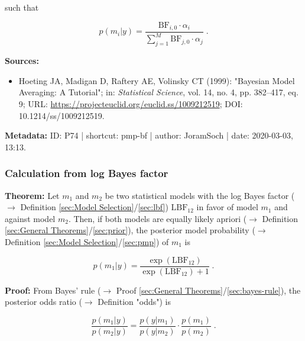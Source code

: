 \documentclass[a4paper,12pt,twoside]{book}
\begin{document}
such that

\begin{equation} \label{eq:pmp-bf-PMP-BF-qed}
p(m_i|y)= \frac{\mathrm{BF}_{i,0} \cdot \alpha_i}{\sum_{j=1}^{M} \mathrm{BF}_{j,0} \cdot \alpha_j} \; .
\end{equation}


\vspace{1em}
\textbf{Sources:}
\begin{itemize}
\item Hoeting JA, Madigan D, Raftery AE, Volinsky CT (1999): "Bayesian Model Averaging: A Tutorial"; in: \textit{Statistical Science}, vol. 14, no. 4, pp. 382–417, eq. 9; URL: \url{https://projecteuclid.org/euclid.ss/1009212519}; DOI: 10.1214/ss/1009212519.
\end{itemize}


\vspace{1em}
\textbf{Metadata:} ID: P74 | shortcut: pmp-bf | author: JoramSoch | date: 2020-03-03, 13:13.
\vspace{1em}



\subsubsection[\textbf{Calculation from log Bayes factor}]{Calculation from log Bayes factor} \label{sec:pmp-lbf}
\setcounter{equation}{0}

\textbf{Theorem:} Let $m_1$ and $m_2$ be two statistical models with the log Bayes factor ($\rightarrow$ Definition \ref{sec:Model Selection}/\ref{sec:lbf}) $\mathrm{LBF}_{12}$ in favor of model $m_1$ and against model $m_2$. Then, if both models are equally likely apriori ($\rightarrow$ Definition \ref{sec:General Theorems}/\ref{sec:prior}), the posterior model probability ($\rightarrow$ Definition \ref{sec:Model Selection}/\ref{sec:pmp}) of $m_1$ is

\begin{equation} \label{eq:pmp-lbf-PMP-LBF}
p(m_1|y) = \frac{\exp(\mathrm{LBF}_{12})}{\exp(\mathrm{LBF}_{12}) + 1} \; .
\end{equation}


\vspace{1em}
\textbf{Proof:} From Bayes' rule ($\rightarrow$ Proof \ref{sec:General Theorems}/\ref{sec:bayes-rule}), the posterior odds ratio ($\rightarrow$ Definition "odds") is

\begin{equation} \label{eq:pmp-lbf-post-odds-s1}
\frac{p(m_1|y)}{p(m_2|y)} = \frac{p(y|m_1)}{p(y|m_2)} \cdot \frac{p(m_1)}{p(m_2)} \; .
\end{equation}
\end{document}
